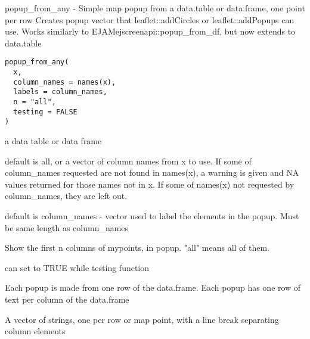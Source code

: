 \documentclass[a4paper]{book}
\begin{document}
%
\begin{Description}\relax
popup\_from\_any - Simple map popup from a data.table or data.frame, one point per row
Creates popup vector that leaflet::addCircles or leaflet::addPopups can use.
Works similarly to EJAMejscreenapi::popup\_from\_df, but now extends to data.table
\end{Description}
%
\begin{Usage}
\begin{verbatim}
popup_from_any(
  x,
  column_names = names(x),
  labels = column_names,
  n = "all",
  testing = FALSE
)
\end{verbatim}
\end{Usage}
%
\begin{Arguments}
\begin{ldescription}
\item[\code{x, }] a data table or data frame

\item[\code{column\_names}] default is all, or a vector of column names from x to use.
If some of column\_names requested are not found in names(x),
a warning is given and NA values returned for those names not in x.
If some of names(x) not requested by column\_names, they are left out.

\item[\code{labels}] default is column\_names - vector used to label
the elements in the popup. Must be same length as column\_names

\item[\code{n}] Show the first n columns of mypoints, in popup. "all" means all of them.

\item[\code{testing}] can set to TRUE while testing function
\end{ldescription}
\end{Arguments}
%
\begin{Details}\relax
Each popup is made from one row of the data.frame.
Each popup has one row of text per column of the data.frame
\end{Details}
%
\begin{Value}
A vector of strings, one per row or map point,
with a line break separating column elements
\end{Value}
\end{document}
